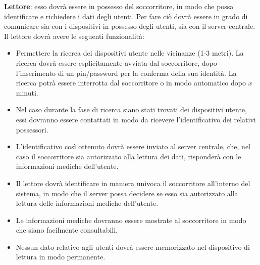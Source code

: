 \documentclass[a4paper,12pt]{report}
\begin{document}
\begin{description}
	\item \textbf{Lettore}: esso dovrà essere in possesso del soccorritore, in modo che possa identificare e richiedere i dati degli utenti. Per fare ciò dovrà essere in grado di comunicare sia con i dispositivi in possesso degli utenti, sia con il server centrale. Il lettore dovrà avere le seguenti funzionalità:
	\begin{itemize}
		\item Permettere la ricerca dei dispositivi utente nelle vicinanze (1-3 metri). La ricerca dovrà essere esplicitamente avviata dal soccorritore, dopo l'inserimento di un pin/password per la conferma della sua identità. La ricerca potrà essere interrotta dal soccorritore o in modo automatico dopo $x$ minuti.
		\item Nel caso durante la fase di ricerca siano stati trovati dei dispositivi utente, essi dovranno essere contattati in modo da ricevere l'identificativo dei relativi possessori.
		\item L'identificativo così ottenuto dovrà essere inviato al server centrale, che, nel caso il soccorritore sia autorizzato alla lettura dei dati, risponderà con le informazioni mediche dell'utente. 
		\item Il lettore dovrà identificare in maniera univoca il soccorritore all'interno del sistema, in modo che il server possa decidere se esso sia autorizzato alla lettura delle informazioni mediche dell'utente. 
		\item Le informazioni mediche dovranno essere mostrate al soccorritore in modo che siano facilmente consultabili.
		\item Nessun dato relativo agli utenti dovrà essere memorizzato nel dispositivo di lettura in modo permanente. 
	\end{itemize}


\end{description}
\end{document}
